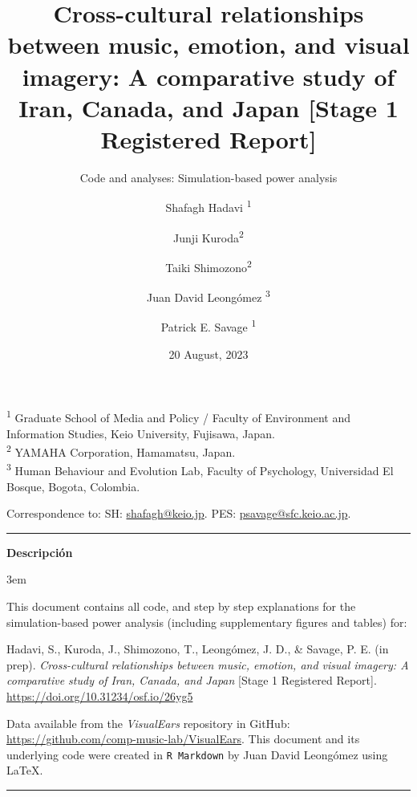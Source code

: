 \documentclass[
  bookmarksnumbered]{article}
\title{Cross-cultural relationships between music, emotion, and visual imagery: A comparative study of Iran, Canada, and Japan {[}Stage 1 Registered Report{]}}
\subtitle{Code and analyses: Simulation-based power analysis}
\author{Shafagh Hadavi \orcidlink{0009-0008-1184-7238}\textsuperscript{1} \and Junji Kuroda\textsuperscript{2} \and Taiki Shimozono\textsuperscript{2} \and Juan David Leongómez \orcidlink{0000-0002-0092-6298}\textsuperscript{3} \and Patrick E. Savage \orcidlink{0000-0001-6996-7496}\textsuperscript{1}}
\date{20 August, 2023}
\begin{document}
\maketitle

\textsuperscript{1} Graduate School of Media and Policy / Faculty of Environment and Information Studies, Keio University, Fujisawa, Japan.\\
\textsuperscript{2} YAMAHA Corporation, Hamamatsu, Japan.\\
\textsuperscript{3} Human Behaviour and Evolution Lab, Faculty of Psychology, Universidad El Bosque, Bogota, Colombia.

\begin{center}
Correspondence to:
SH: \href{mailto:shafagh@keio.jp}{shafagh@keio.jp}. 
PES: \href{mailto:psavage@sfc.keio.ac.jp}{psavage@sfc.keio.ac.jp}.

\begin{center}\rule{0.5\linewidth}{0.5pt}\end{center}

\textbf{Descripción}
\end{center}

\par
\begingroup
\leftskip3em
\rightskip\leftskip

This document contains all code, and step by step explanations for the simulation-based power analysis (including supplementary figures and tables) for:

\begin{hangparas}{.25in}{1}
Hadavi, S., Kuroda, J., Shimozono, T., Leongómez, J. D., \& Savage, P. E. (in prep). \textit{Cross-cultural relationships between music, emotion, and visual imagery: A comparative study of Iran, Canada, and Japan} [Stage 1 Registered Report]. \url{https://doi.org/10.31234/osf.io/26yg5}
\end{hangparas}

Data available from the \emph{VisualEars} repository in GitHub: \url{https://github.com/comp-music-lab/VisualEars}. This document and its underlying code were created in \texttt{R\ Markdown} by Juan David Leongómez using \LaTeX.

\begin{center}\rule{0.5\linewidth}{0.5pt}\end{center}

\par
\endgroup

{\hypersetup{hidelinks}
\setcounter{tocdepth}{6}
\tableofcontents
}
\opensupplement
\end{document}
